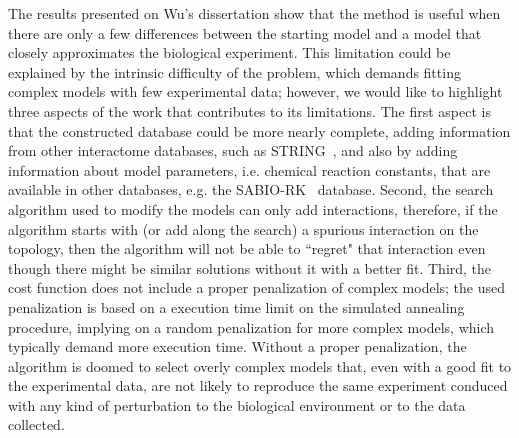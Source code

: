 The results presented on Wu's dissertation show that the method is 
useful when there are only a few differences between the starting model
and a model that closely approximates the biological experiment. This
limitation could be explained by the intrinsic difficulty of the 
problem, which demands fitting complex models with few experimental 
data; however, we would like to highlight three aspects of the work that 
contributes to its limitations. The first aspect is that the constructed 
database could be more nearly complete, adding information from other 
interactome databases, such as STRING~\cite{Szklarczyk2010}, and also by 
adding information about model parameters, i.e. chemical reaction 
constants, that are available in other databases, e.g. the 
SABIO-RK~\cite{Wittig2011} database. Second, the search algorithm used
to modify the models can only add interactions, therefore, if the 
algorithm starts with (or add along the search) a spurious interaction 
on the topology, then the algorithm will not be able to ``regret" that 
interaction even though there might be similar solutions without it with a
better fit. Third, the cost function does not include a proper 
penalization of complex models; the used penalization is based on a 
execution time limit on the simulated annealing procedure, implying on a 
random penalization for more complex models, which typically demand more 
execution time. Without a proper penalization, the algorithm is doomed 
to select overly complex models that, even with a good fit to the 
experimental data, are not likely to reproduce the same experiment
conduced with any kind of perturbation to the biological environment or 
to the data collected.

